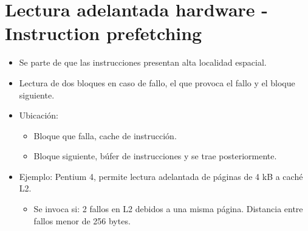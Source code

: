\documentclass[12pt, twoside, openright]{report} %
\begin{document}
\section{Lectura adelantada hardware - Instruction prefetching}

\begin{itemize}

	\item Se parte de que las instrucciones presentan alta localidad
	      espacial.
	\item Lectura de dos bloques en caso de fallo, el que provoca el fallo y
	      el bloque siguiente.
	\item Ubicación:

	      \begin{itemize}

		      \item Bloque que falla, cache de instrucción.
		      \item Bloque siguiente, búfer de instrucciones y se trae
		            posteriormente.
	      \end{itemize}
	\item Ejemplo: Pentium 4, permite lectura adelantada de páginas de 4 kB a
	      caché L2.

	      \begin{itemize}

		      \item Se invoca si: 2 fallos en L2 debidos a una misma página.
		            Distancia entre fallos menor de 256 bytes.
	      \end{itemize}
\end{itemize}
\pagebreak
\end{document}
